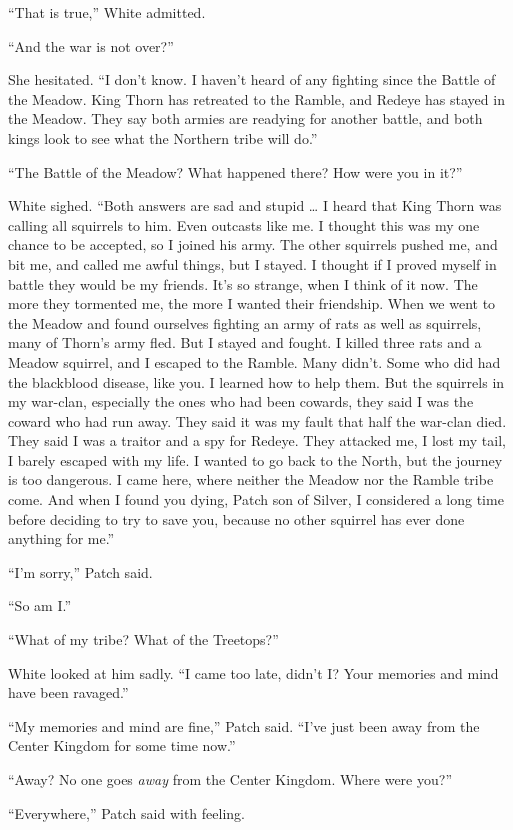 \documentclass[ebook,oneside,openany,12pt]{memoir}
\begin{document}
“That is true,” White admitted.

“And the war is not over?”

She hesitated. “I don’t know. I haven’t heard of any fighting since
the Battle of the Meadow. King Thorn has retreated to the Ramble, and
Redeye has stayed in the Meadow. They say both armies are readying for
another battle, and both kings look to see what the Northern tribe
will do.”

“The Battle of the Meadow? What happened there? How were you in it?”

White sighed. “Both answers are sad and stupid … I heard that King
Thorn was calling all squirrels to him. Even outcasts like me. I
thought this was my one chance to be accepted, so I joined his
army. The other squirrels pushed me, and bit me, and called me awful
things, but I stayed. I thought if I proved myself in battle they
would be my friends. It’s so strange, when I think of it now. The more
they tormented me, the more I wanted their friendship. When we went to
the Meadow and found ourselves fighting an army of rats as well as
squirrels, many of Thorn’s army fled. But I stayed and fought. I
killed three rats and a Meadow squirrel, and I escaped to the
Ramble. Many didn’t. Some who did had the blackblood disease, like
you. I learned how to help them. But the squirrels in my war-clan,
especially the ones who had been cowards, they said I was the coward
who had run away. They said it was my fault that half the war-clan
died. They said I was a traitor and a spy for Redeye. They attacked
me, I lost my tail, I barely escaped with my life. I wanted to go back
to the North, but the journey is too dangerous. I came here, where
neither the Meadow nor the Ramble tribe come. And when I found you
dying, Patch son of Silver, I considered a long time before deciding
to try to save you, because no other squirrel has ever done anything
for me.”

“I’m sorry,” Patch said.

“So am I.”

“What of my tribe? What of the Treetops?”

White looked at him sadly. “I came too late, didn’t I? Your memories
and mind have been ravaged.”

“My memories and mind are fine,” Patch said. “I’ve just been away from
the Center Kingdom for some time now.”

“Away? No one goes \emph{away} from the Center Kingdom. Where were
you?”

“Everywhere,” Patch said with feeling.
\end{document}
